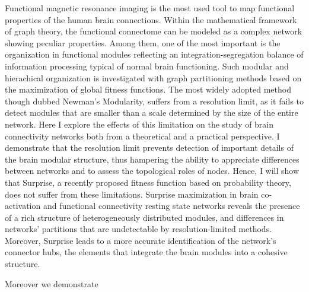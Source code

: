 Functional magnetic resonance imaging is the most used tool to map functional properties of the human brain connections. Within the mathematical framework of graph theory, the functional connectome can be modeled as a complex network showing peculiar properties.
Among them, one of the most important is the organization in functional modules reflecting an integration-segregation balance of information processing typical of normal brain functioning.
Such modular and hierachical organization is investigated with graph partitioning methods based on the maximization of global fitness functions. The most widely adopted method though dubbed Newman's Modularity, suffers from a resolution limit, as it fails to detect modules that are smaller than a scale determined by the size of the entire network.
Here I explore the effects of this limitation on the study of brain connectivity networks both from a theoretical and a practical perspective.
I demonstrate that the resolution limit prevents detection of important details of the brain modular structure, thus hampering the ability to appreciate differences between networks and to assess the topological roles of nodes.
Hence, I will show that Surprise, a recently proposed fitness function based on probability theory, does not suffer from these limitations.
Surprise maximization in brain co-activation and functional connectivity resting state networks reveals the presence of a rich structure of heterogeneously distributed modules, and differences in networks' partitions that are undetectable by resolution-limited methods.
Moreover, Surprise leads to a more accurate identification of the network's connector hubs, the elements that integrate the brain modules into a cohesive structure.

Moreover we demonstrate